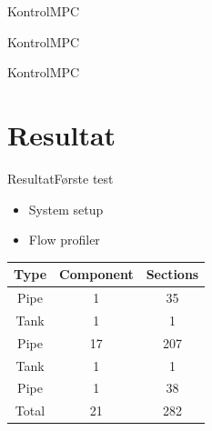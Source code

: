 \begin{frame}{Kontrol}{MPC}
 \begin{figure}[H]
 \centering
 
\label{fig:MPC_test_output_first_test}
\end{figure}   


\end{frame}

\begin{frame}{Kontrol}{MPC}
\begin{figure}[H]
 \centering
 
\label{fig:tank_height_first_test}
\end{figure}    


\end{frame}

\begin{frame}{Kontrol}{MPC}
 \begin{figure}[H]
 \centering
 
\label{fig:MPC_test_output_second_test_with_constraints}
\end{figure}   


\end{frame}



\section{Resultat}

\begin{frame}{Resultat}{Første test}
\vfill \vfill\centering
\begin{minipage}[t]{0.48\linewidth}
\begin{itemize}
	   	\item System setup
	   	\item Flow profiler 
\end{itemize}    
\end{minipage}\hfill
\begin{minipage}[t]{0.48\linewidth}
\begin{table}[H]
\centering
\begin{tabular}{|c|c|c|}
\hline
	\rowcolor[HTML]{9B9B9B} 
Type  & Component & Sections \\ \hline
Pipe  & 1         & 35       \\ \hline
Tank  & 1         & 1        \\ \hline
Pipe  & 17        & 207      \\ \hline
Tank  & 1         & 1        \\ \hline
Pipe  & 1         & 38        \\ \hline
Total & 21        & 282      \\ \hline
\end{tabular}
\label{tab:system_setup_nonlinear_linear_testv2}
\end{table}
\end{minipage}

\vfill \vfill

\end{frame}

